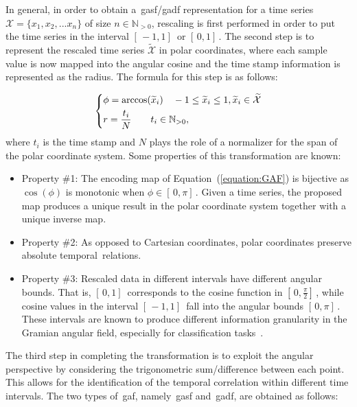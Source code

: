 In general, in order to obtain a~\gls{gasf}/\gls{gadf} representation for a time series $\mathcal{X}=\{x_{1}, x_{2}, ... x_{n}\}$ of size $n \in \mathbb{N}_{>0}$, rescaling is first performed in order to put the time series in the interval $[\,-1,1] \,$ or $[\,0,1]\,$. The second step is to represent the rescaled time series $\widetilde{\mathcal{X}}$ in polar coordinates, where each sample value is now mapped into the angular cosine and the time stamp information is represented as the radius. 
The formula for this step is as follows:

\begin{equation}
\begin{dcases}
  \phi = \arccos(\widetilde{x}_{i}) \quad -1 \leq \widetilde{x}_{i} \leq 1, \widetilde{x}_{i} \in \widetilde{\mathcal{X}} \\
  r = \frac{t_{i}}{N} \quad \quad t_{i} \in \mathbb{N}_{>0},
\end{dcases}
\label{equation:GAF}
\end{equation} 
where $t_{i}$ is the time stamp and $N$ plays the role of a normalizer for the span of the polar coordinate system. Some properties of this transformation are known:

\begin{itemize}[leftmargin=*,labelsep=5.8mm]
\item {Property \#1}: The encoding map of Equation~(\ref{equation:GAF}) is bijective as $\cos(\phi)$ is monotonic when $\phi \in [\,0,\pi]\,$. Given a time series, the proposed map produces a unique result in the polar coordinate system together with a unique inverse map. 
\item {Property \#2}: As opposed to Cartesian coordinates, polar coordinates preserve absolute temporal~relations.
\item {Property \#3}: Rescaled data in different intervals have different angular bounds. That is, $[\,0,1]\,$ corresponds to the cosine function in $[\,0,\frac{\pi}{2}]\,$, while cosine values in the interval $[\,-1,1]\,$ fall into the angular bounds $[\,0,\pi]\,$. These intervals are known to produce different information granularity in the Gramian angular field, especially for classification tasks~\citep{wang_imaging_2015}.
\end{itemize}

The third step in completing the transformation is to exploit the angular perspective by considering the trigonometric sum/difference between each point. This allows for the identification of the temporal correlation within different time intervals. The two types of~\gls{gaf}, namely~\gls{gasf} and~\gls{gadf}, are obtained as follows:

